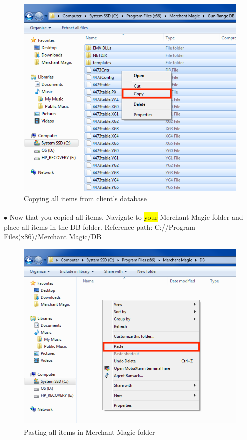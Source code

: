 \documentclass[a4paper, 11pt]{article}
\begin{document}
\begin{figure}[h]
    \centering
    \includegraphics[width=\textwidth]{capture 11}
    \caption{Copying all items from client's database}
\end{figure}
\vspace*{\fill}

\pagebreak

\vspace*{\fill}
$\bullet$ Now that you copied all items. Navigate to \colorbox{yellow}{your} Merchant Magic\textsuperscript{\textregistered} folder and place all items in the DB folder. Reference path: C://Program Files(x86)/Merchant Magic/DB

\begin{figure}[h]
    \centering
    \includegraphics[width=\textwidth]{capture 12}
    \caption{Pasting all items in Merchant Magic\textsuperscript{\textregistered} folder}
\end{figure}
\vspace*{\fill}
\end{document}
